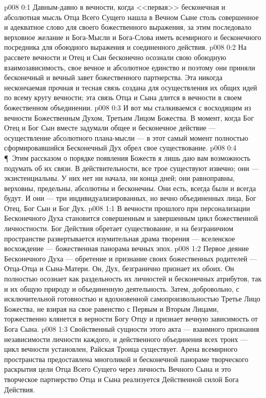 \vs p008 0:1 Давным\hyp{}давно в вечности, когда <<первая>> бесконечная и абсолютная мысль Отца Всего Сущего нашла в Вечном Сыне столь совершенное и адекватное слово для своего божественного выражения, за этим последовало верховное желание и Бога\hyp{}Мысли и Бога\hyp{}Слова иметь всемирного и бесконечного посредника для обоюдного выражения и соединенного действия.
\vs p008 0:2 На рассвете вечности и Отец и Сын бесконечно осознали свою обоюдную взаимозависимость, свое вечное и абсолютное единство и поэтому они приняли бесконечный и вечный завет божественного партнерства. Эта никогда нескончаемая прочная и тесная связь создана для осуществления их общих идей по всему кругу вечности; эта связь Отца и Сына длится в вечности в своем божественном объединении.
\vs p008 0:3 И вот мы сталкиваемся с восходящим из вечности Божественным Духом, Третьим Лицом Божества. В момент, когда Бог Отец и Бог Сын вместе задумали общее и бесконечное действие --- осуществление абсолютного плана\hyp{}мысли --- в этот самый момент полностью сформировавшийся Бесконечный Дух обрел свое существование.
\vs p008 0:4 \P\ Этим рассказом о порядке появления Божеств я лишь даю вам возможность подумать об их связи. В действительности, все трое существуют извечно; они --- экзистенциальны. У них нет ни начала, ни конца дней; они равноправны, верховны, предельны, абсолютны и бесконечны. Они есть, всегда были и всегда будут. И они --- три индивидуализированных, но вечно объединенных лица, Бог Отец, Бог Сын и Бог Дух.
\vs p008 1:1 В вечности прошлого при персонализации Бесконечного Духа становится совершенным и завершенным цикл божественной личностности. Бог Действия обретает существование, и на безграничном пространстве развертывается изумительная драма творения --- вселенское восхождение --- божественная панорама вечных эпох.
\vs p008 1:2 Первое деяние Бесконечного Духа --- обретение и признание своих божественных родителей --- Отца\hyp{}Отца и Сына\hyp{}Матери. Он, Дух, безгранично признает их обоих. Он полностью осознает как раздельность их личностей и бесконечных атрибутов, так и их общую природу и объединенную деятельность. Затем, добровольно, с исключительной готовностью и вдохновенной самопроизвольностью Третье Лицо Божества, не взирая на свое равенство с Первым и Вторым Лицами, торжественно клянется в верности Богу Отцу и признает вечную зависимость от Бога Сына.
\vs p008 1:3 Свойственный сущности этого акта --- взаимного признания независимости личности каждого, и действенного объединения всех троих --- цикл вечности установлен, Райская Троица существует. Арена всемирного пространства предоставлена многоликой и бесконечной панораме творческого раскрытия цели Отца Всего Сущего через личность Вечного Сына и это творческое партнерство Отца и Сына реализуется Действенной силой Бога Действия.
